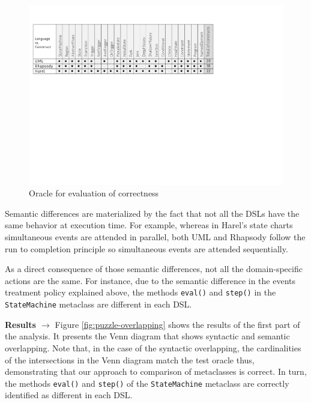\begin{figure}
\centering
\includegraphics[width=1\linewidth]{images/oracle.pdf}
\caption{Oracle for evaluation of correctness}
\label{fig:oracle}
\end{figure}

Semantic differences are materialized by the fact that not all the DSLs have the same behavior at execution time. For example, whereas in Harel's state charts simultaneous events are attended in parallel, both UML and Rhapsody follow the run to completion principle so simultaneous events are attended sequentially. 

As a direct consequence of those semantic differences, not all the domain-specific actions are the same. For instance, due to the semantic difference in the events treatment policy explained above, the methods \texttt{eval()} and \texttt{step()} in the \texttt{StateMachine} metaclass are different in each DSL. 

\textbf{Results $\rightarrow$} Figure \ref{fig:puzzle-overlapping} shows the results of the first part of the analysis. It presents the Venn diagram that shows syntactic and semantic overlapping. Note that, in the case of the syntactic overlapping, the cardinalities of the intersections in the Venn diagram match the test oracle thus, demonstrating that our approach to comparison of metaclasses is correct. In turn, the methods \texttt{eval()} and \texttt{step()} of the \texttt{StateMachine} metaclass are correctly identified as different in each DSL.

